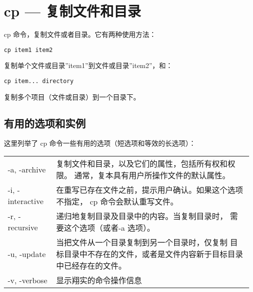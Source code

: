 \section{cp — 复制文件和目录} %
\label{sec:cp_复制文件和目录}

cp 命令，复制文件或者目录。它有两种使用方法：
\begin{lstlisting}
cp item1 item2
\end{lstlisting}
\par 复制单个文件或目录”item1”到文件或目录”item2”，和：
\begin{lstlisting}
cp item... directory
\end{lstlisting}
\par 复制多个项目（文件或目录）到一个目录下。

\subsection{有用的选项和实例}
这里列举了 cp 命令一些有用的选项（短选项和等效的长选项）：

\begin{center} 
\tablelasttail{\bottomrule}

\begin{supertabular}{p{3.5cm}p{10cm}}
-a, -\-archive	& 复制文件和目录，以及它们的属性，包括所有权和权限。 通常，复本具有用户所操作文件的默认属性。\\
-i, -\-interactive & 	在重写已存在文件之前，提示用户确认。如果这个选项不指定， cp 命令会默认重写文件。\\
-r, -\-recursive	& 递归地复制目录及目录中的内容。当复制目录时， 需要这个选项（或者-a 选项）。\\
-u, -\-update	& 当把文件从一个目录复制到另一个目录时，仅复制 目标目录中不存在的文件，或者是文件内容新于目标目录中已经存在的文件。\\
-v, -\-verbose	& 显示翔实的命令操作信息 \\

\end{supertabular}
\end{center}


